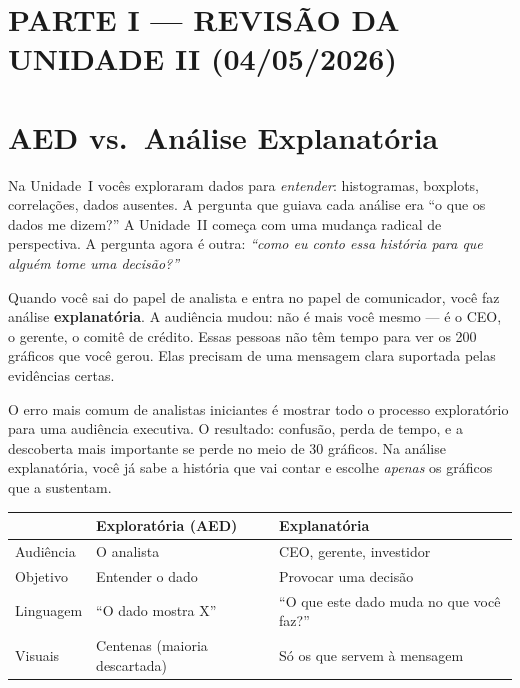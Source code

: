 \section*{\Large PARTE I --- REVISÃO DA UNIDADE II (04/05/2026)}

\section{AED vs.\ Análise Explanatória}

Na Unidade~I vocês exploraram dados para \emph{entender}: histogramas, boxplots, correlações, dados ausentes. A pergunta que guiava cada análise era ``o que os dados me dizem?'' A Unidade~II começa com uma mudança radical de perspectiva. A pergunta agora é outra: \textit{``como eu conto essa história para que alguém tome uma decisão?''}

Quando você sai do papel de analista e entra no papel de comunicador, você faz análise \textbf{explanatória}. A audiência mudou: não é mais você mesmo --- é o CEO, o gerente, o comitê de crédito. Essas pessoas não têm tempo para ver os 200 gráficos que você gerou. Elas precisam de uma mensagem clara suportada pelas evidências certas.

O erro mais comum de analistas iniciantes é mostrar todo o processo exploratório para uma audiência executiva. O resultado: confusão, perda de tempo, e a descoberta mais importante se perde no meio de 30 gráficos. Na análise explanatória, você já sabe a história que vai contar e escolhe \emph{apenas} os gráficos que a sustentam.

\begin{BoardBox}[title=AED vs.\ Explanatória]
\begin{tabular}{@{}lp{4.2cm}p{5.2cm}@{}}
\toprule
 & \textbf{Exploratória (AED)} & \textbf{Explanatória} \\
\midrule
Audiência & O analista & CEO, gerente, investidor \\
Objetivo  & Entender o dado & Provocar uma decisão \\
Linguagem & ``O dado mostra X'' & ``O que este dado muda no que você faz?'' \\
Visuais   & Centenas (maioria descartada) & Só os que servem à mensagem \\
\bottomrule
\end{tabular}
\end{BoardBox}

